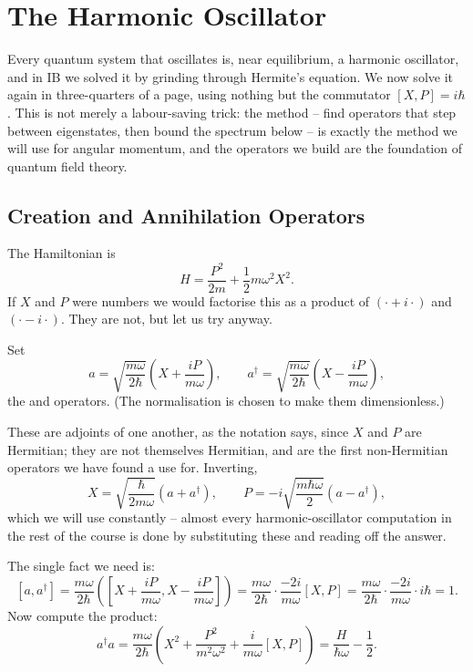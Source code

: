 \section{The Harmonic Oscillator}

Every quantum system that oscillates is, near equilibrium, a harmonic oscillator, and in IB we solved it by grinding through Hermite's equation. We now solve it again in three-quarters of a page, using nothing but the commutator $[X,P] = i\hbar$. This is not merely a labour-saving trick: the method -- find operators that step between eigenstates, then bound the spectrum below -- is exactly the method we will use for angular momentum, and the operators we build are the foundation of quantum field theory.

\subsection{Creation and Annihilation Operators}

The Hamiltonian is
$$
H = \frac{P^2}{2m} + \frac{1}{2}m\omega^2 X^2.
$$
If $X$ and $P$ were numbers we would factorise this as a product of $(\cdot + i \cdot)$ and $(\cdot - i\cdot)$. They are not, but let us try anyway.

\begin{definition}
    Set
    $$
    a = \sqrt{\frac{m\omega}{2\hbar}}\left( X + \frac{i P}{m\omega} \right), \qquad
    a^\dagger = \sqrt{\frac{m\omega}{2\hbar}}\left( X - \frac{i P}{m\omega} \right),
    $$
    the  and  operators. (The normalisation is chosen to make them dimensionless.)
\end{definition}

These are adjoints of one another, as the notation says, since $X$ and $P$ are Hermitian; they are not themselves Hermitian, and are the first non-Hermitian operators we have found a use for. Inverting,
$$
X = \sqrt{\frac{\hbar}{2m\omega}}\left(a + a^\dagger\right), \qquad P = -i\sqrt{\frac{m\hbar\omega}{2}}\left(a - a^\dagger\right),
$$
which we will use constantly -- almost every harmonic-oscillator computation in the rest of the course is done by substituting these and reading off the answer.

The single fact we need is:
$$
[a, a^\dagger] = \frac{m\omega}{2\hbar}\left( \left[X + \frac{iP}{m\omega}, X - \frac{iP}{m\omega}\right] \right) = \frac{m\omega}{2\hbar}\cdot\frac{-2i}{m\omega}[X,P] = \frac{m\omega}{2\hbar}\cdot\frac{-2i}{m\omega}\cdot i\hbar = 1.
$$
Now compute the product:
$$
a^\dagger a = \frac{m\omega}{2\hbar}\left( X^2 + \frac{P^2}{m^2\omega^2} + \frac{i}{m\omega}[X, P] \right) = \frac{H}{\hbar\omega} - \frac{1}{2}.
$$

